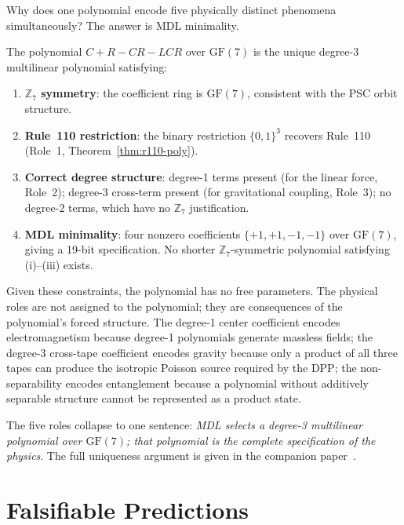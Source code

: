 \documentclass[11pt]{article}
\theoremstyle{remark}
\newcommand{\ZS}{\mathbb{Z}_7}
\newcommand{\polyform}{C+R-CR-LCR}
\newcommand{\FF}{\mathrm{GF}}
\begin{document}
Why does one polynomial encode five physically distinct phenomena
simultaneously?  The answer is MDL minimality.

The polynomial $\polyform$ over $\FF(7)$ is the unique degree-3
multilinear polynomial satisfying:
\begin{enumerate}[label=(\roman*)]
  \item \textbf{$\ZS$ symmetry}: the coefficient ring is $\FF(7)$,
        consistent with the PSC orbit structure.
  \item \textbf{Rule~110 restriction}: the binary restriction
        $\{0,1\}^3$ recovers Rule~110 (Role~1,
        Theorem~\ref{thm:r110-poly}).
  \item \textbf{Correct degree structure}: degree-1 terms present
        (for the linear force, Role~2); degree-3 cross-term present
        (for gravitational coupling, Role~3); no degree-2 terms,
        which have no $\ZS$ justification.
  \item \textbf{MDL minimality}: four nonzero coefficients
        $\{+1,+1,-1,-1\}$ over $\FF(7)$, giving a 19-bit
        specification.  No shorter $\ZS$-symmetric polynomial
        satisfying (i)--(iii) exists.
\end{enumerate}

Given these constraints, the polynomial has no free parameters.  The
physical roles are not assigned to the polynomial; they are
consequences of the polynomial's forced structure.  The degree-1
center coefficient encodes electromagnetism because degree-1 polynomials
generate massless fields; the degree-3 cross-tape coefficient encodes
gravity because only a product of all three tapes can produce the
isotropic Poisson source required by the DPP; the non-separability
encodes entanglement because a polynomial without additively
separable structure cannot be represented as a product state.

The five roles collapse to one sentence: \emph{MDL selects a degree-3
multilinear polynomial over $\FF(7)$; that polynomial is the complete
specification of the physics}.  The full uniqueness argument is given
in the companion paper~\cite{SpivackGTEPolynomialUFT}.

\FloatBarrier

\section{Falsifiable Predictions}
\label{sec:predictions}
\end{document}
